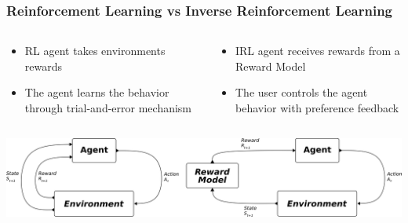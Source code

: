 
\begin{frame}
	\frametitle{Reinforcement Learning vs Inverse Reinforcement Learning}
	
 	\begin{columns}
		\begin{column}{0.5\textwidth}
			
			\begin{itemize}
				\item<1-> RL agent takes environments rewards
				\item<2-> The agent learns the behavior through trial-and-error mechanism
			\end{itemize}
			
		\end{column}
		\begin{column}{0.5\textwidth}
			\begin{itemize}
				\item<1-> IRL agent receives rewards from a Reward Model
				\item<2-> The user controls the agent behavior with preference feedback 
			\end{itemize}			
		\end{column}
		
	\end{columns}
	\vspace{1cm}
	\centering
	\includegraphics[width=1\linewidth]{images/IRL+RL.png}

\end{frame}


